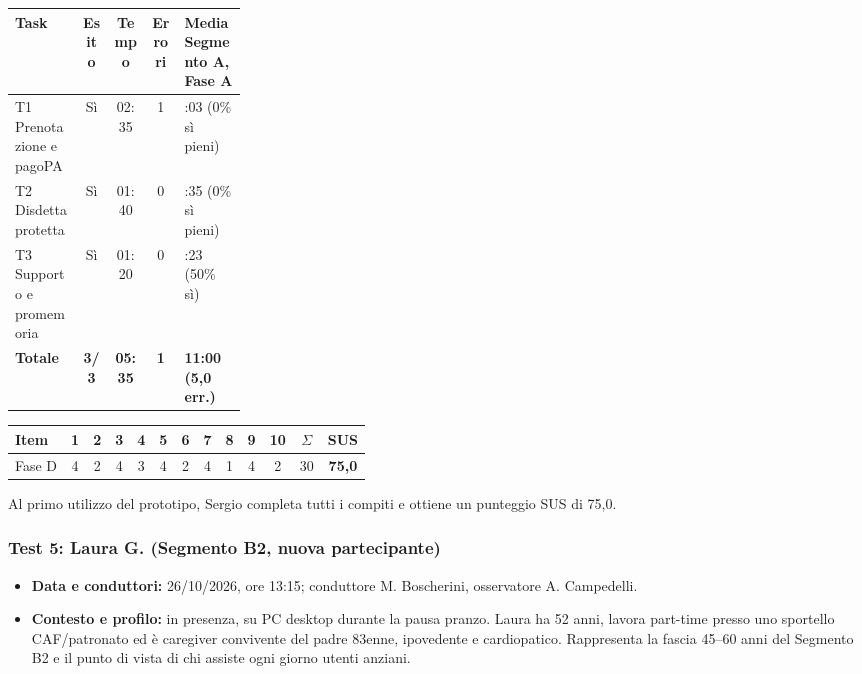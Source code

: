 \begin{center}
\label{tab:d-test-sergio}
\footnotesize
\begin{tabularx}{\linewidth}{@{}>{\raggedright\arraybackslash}X c c c >{\centering\arraybackslash}p{0.27\linewidth}@{}}
\toprule
\textbf{Task} & \textbf{Esito} & \textbf{Tempo} & \textbf{Errori} & \textbf{Media Segmento A, Fase A} \\
\midrule
T1 Prenotazione e pagoPA & Sì & 02:35 & 1 & 03:03 (0\% sì pieni) \\
T2 Disdetta protetta & Sì & 01:40 & 0 & 05:35 (0\% sì pieni) \\
T3 Supporto e promemoria & Sì & 01:20 & 0 & 02:23 (50\% sì) \\
\midrule
\textbf{Totale} & \textbf{3/3} & \textbf{05:35} & \textbf{1} & \textbf{11:00 (5,0 err.)} \\
\bottomrule
\end{tabularx}
\end{center}

\begin{center}
\label{tab:d-sus-sergio}
\footnotesize
\setlength{\tabcolsep}{3.5pt}
\begin{tabular}{@{}l *{10}{c} c c@{}}
\toprule
\textbf{Item} & \textbf{1} & \textbf{2} & \textbf{3} & \textbf{4} & \textbf{5} & \textbf{6} & \textbf{7} & \textbf{8} & \textbf{9} & \textbf{10} & $\Sigma$ & \textbf{SUS} \\
\midrule
Fase D & 4 & 2 & 4 & 3 & 4 & 2 & 4 & 1 & 4 & 2 & 30 & \textbf{75,0} \\
\bottomrule
\end{tabular}
\end{center}

Al primo utilizzo del prototipo, Sergio completa tutti i compiti e ottiene un punteggio SUS di 75,0.

\subsubsection{Test 5: Laura G. (Segmento B2, nuova partecipante)}

\begin{itemize}
\item \textbf{Data e conduttori:} 26/10/2026, ore 13:15; conduttore M. Boscherini, osservatore A. Campedelli.
\item \textbf{Contesto e profilo:} in presenza, su PC desktop durante la pausa pranzo. Laura ha 52 anni, lavora part-time presso uno sportello CAF/patronato ed è caregiver convivente del padre 83enne, ipovedente e cardiopatico. Rappresenta la fascia 45--60 anni del Segmento B2 e il punto di vista di chi assiste ogni giorno utenti anziani.
\end{itemize}

